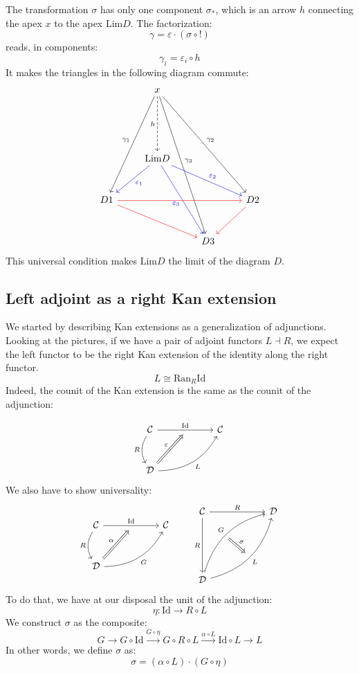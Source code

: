 \documentclass[DaoFP]{subfiles}
\begin{document}
The transformation $\sigma$ has only one component $\sigma_*$, which is an arrow $h$ connecting the apex $x$ to the apex $\text{Lim} D$. The factorization:
 \[ \gamma = \varepsilon \cdot (\sigma \circ !) \]
reads, in components:
\[ \gamma_i = \varepsilon_i \circ h \]
It makes the triangles in the following diagram commute:
\[
 \begin{tikzcd}[row sep=1cm]
  & x
\arrow[dddl, "\gamma_1"']
\arrow[ddddr, "\gamma_3"]
\arrow[dddrr, "\gamma_2"]
\arrow[dd, dashed, "h"']
 \\
 \\
 & \text{Lim} D
\arrow[dl, blue, "\varepsilon_1"]
\arrow[ddr, blue, "\varepsilon_3"']
\arrow[drr, blue, "\varepsilon_2"]
\\
D 1 
\arrow[rrr, red]
\arrow[rrd, red]
&&& D 2
\arrow[dl, red]
\\
&& D 3
 \end{tikzcd}
 \]
This universal condition makes $\text{Lim} D$ the limit of the diagram $D$.


 \subsection{Left adjoint as a right Kan extension}
 
 We started by describing Kan extensions as a generalization of adjunctions. Looking at the pictures, if we have a pair of adjoint functors $L \dashv R$, we expect the left functor to be the right Kan extension of the identity along the right functor.
 \[ L \cong \text{Ran}_R \text{Id} \]
Indeed, the counit of the Kan extension is the same as the counit of the adjunction:

 \[
 \begin{tikzcd} [row sep=1cm, column sep=1cm]
 \cat C
 \arrow[rr, "\text{Id}", "" {name=ID, below} ]
 \arrow[d, bend right, "R"']
 && \cat C
 \\
 \cat D
  \arrow[urr, bend right, "L"']
 \arrow[Rightarrow, "\varepsilon",  to=ID]
 \end{tikzcd}
\]
We also have to show universality:
\[
 \begin{tikzcd} [row sep=1cm, column sep=1cm]
 \cat C
 \arrow[rr, "\text{\text{Id}}", "" {name=ID, below} ]
 \arrow[d, bend right, "R"']
 && \cat C
 \\
 \cat D
  \arrow[urr, bend right, "G"']
 \arrow[Rightarrow, "\alpha",  to=ID]
 \end{tikzcd}
 \qquad %
\begin{tikzcd}[row sep=2cm, column sep=2cm]
\cat C  \ar[d, "R"', "" {name=P}]
            \ar[r, "R", ""  {name=F, below, near start, bend right}]
&
\cat D
\\
\cat D
    \ar[ur, bend left, "G", "" {name=G, below}]
    \ar[ur, bend right, "L"', "" {name=Ran}]
\arrow[Rightarrow, "\sigma", from=G, to=Ran]
\end{tikzcd}
\]
To do that, we have at our disposal the unit of the adjunction:
\[ \eta \colon \text{Id} \to R \circ L \]
We construct $\sigma$ as the composite:
\[ G \rightarrow G \circ \text{Id} \xrightarrow{G \circ \eta} G \circ R \circ L \xrightarrow{\alpha \circ L} \text{Id} \circ L \rightarrow L\]
In other words, we define $\sigma$ as:
\[ \sigma = (\alpha \circ L) \cdot (G \circ \eta) \]
\end{document}

